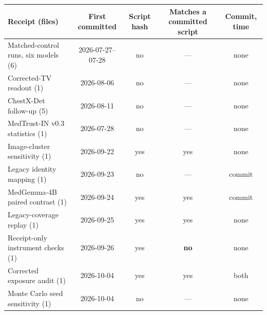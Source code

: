 \begin{tabular}{lcccc}\toprule
Receipt (files) & First committed & Script hash & Matches a committed script & Commit, time \\\midrule
Matched-control runs, six models (6) & 2026-07-27--07-28 & no & --- & none \\
Corrected-TV readout (1) & 2026-08-06 & no & --- & none \\
ChestX-Det follow-up (5) & 2026-08-11 & no & --- & none \\
MedTrust-IN v0.3 statistics (1) & 2026-07-28 & no & --- & none \\
Image-cluster sensitivity (1) & 2026-09-22 & yes & yes & none \\
Legacy identity mapping (1) & 2026-09-23 & no & --- & commit \\
MedGemma-4B paired contrast (1) & 2026-09-24 & yes & yes & commit \\
Legacy-coverage replay (1) & 2026-09-25 & yes & yes & none \\
Receipt-only instrument checks (1) & 2026-09-26 & yes & \textbf{no} & none \\
Corrected exposure audit (1) & 2026-10-04 & yes & yes & both \\
Monte Carlo seed sensitivity (1) & 2026-10-04 & no & --- & none \\
\bottomrule\end{tabular}
